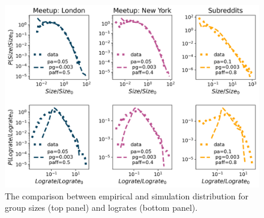 \begin{figure}[h!]
	\centering
	\includegraphics[width=0.8\linewidth]{Figures/figures/Fig4.png}
	\caption{The comparison between empirical and simulation distribution for group sizes (top panel) and logrates (bottom panel).}
	\label{fig:fig6}
\end{figure}




